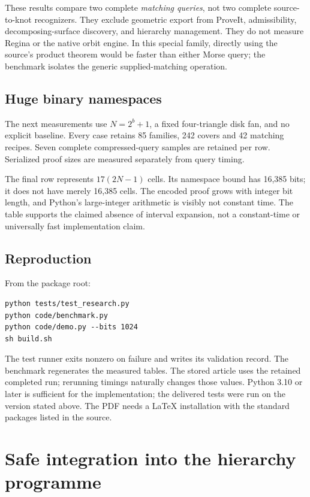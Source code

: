 \documentclass[11pt,letterpaper]{article}
\theoremstyle{definition}
\theoremstyle{remark}\newtheorem{remark}[theorem]{Remark}
\begin{document}
These results compare two complete \emph{matching queries}, not two complete source-to-knot recognizers. They exclude geometric export from ProveIt, admissibility, decomposing-surface discovery, and hierarchy management. They do not measure Regina or the native orbit engine. In this special family, directly using the source's product theorem would be faster than either Morse query; the benchmark isolates the generic supplied-matching operation.

\subsection{Huge binary namespaces}

The next measurements use $N=2^b+1$, a fixed four-triangle disk fan, and no explicit baseline. Every case retains 85 families, 242 covers and 42 matching recipes. Seven complete compressed-query samples are retained per row. Serialized proof sizes are measured separately from query timing.

\begin{center}\small

\end{center}

The final row represents $17(2N-1)$ cells. Its namespace bound has 16,385 bits; it does not have merely 16,385 cells. The encoded proof grows with integer bit length, and Python's large-integer arithmetic is visibly not constant time. The table supports the claimed absence of interval expansion, not a constant-time or universally fast implementation claim.

\subsection{Reproduction}

From the package root:
\begin{verbatim}
python tests/test_research.py
python code/benchmark.py
python code/demo.py --bits 1024
sh build.sh
\end{verbatim}
The test runner exits nonzero on failure and writes its validation record. The benchmark regenerates the measured tables. The stored article uses the retained completed run; rerunning timings naturally changes those values. Python 3.10 or later is sufficient for the implementation; the delivered tests were run on the version stated above. The PDF needs a LaTeX installation with the standard packages listed in the source.

\section{Safe integration into the hierarchy programme}
\label{sec:integration}
\end{document}
